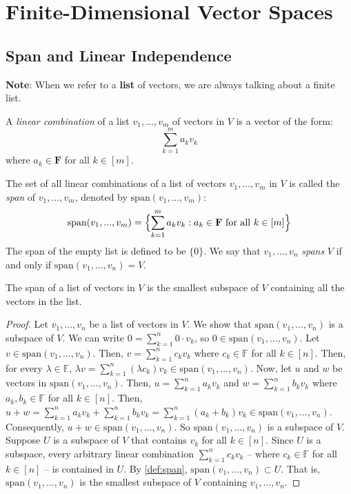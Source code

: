 \documentclass{article}
\begin{document}
\section{Finite-Dimensional Vector Spaces}

\subsection{Span and Linear Independence}

\textbf{Note}: When we refer to a \textbf{list} of vectors, we are
always talking about a finite list.

\begin{definition}
  A \textit{linear combination} of a list $v_1, ..., v_m$ of vectors
  in $V$ is a vector of the form:
  $$\sum_{k=1}^m a_k v_k$$
  where $a_k \in \mathbf{F}$ for all $k \in [m]$.
\end{definition}

\begin{definition}
  \label{def:span}
  The set of all linear combinations of a list of vectors $v_1, ...,
  v_m$ in $V$ is called the \textit{span} of $v_1, ..., v_m$, denoted
  by $\text{span}(v_1, ..., v_m)$:
  $$\text{span}(v_1, ..., v_m) = \Bigl\{\sum_{k=1}^m a_k v_k: a_k \in
  \mathbf{F} \text{ for all } k \in [m]\Bigr\}$$
  The span of the empty list is defined to be $\{0\}$. We say that
  $v_1, ..., v_n$ \textit{spans} $V$ if and only if $\text{span}(v_1,
  ..., v_n) = V$.
\end{definition}

\begin{theorem}
  The span of a list of vectors in $V$ is the smallest subspace of $V$
  containing all the vectors in the list.
\end{theorem}
\begin{proof}
  Let $v_1, ..., v_n$ be a list of vectors in $V$. We show that
  $\text{span}(v_1, ..., v_n)$ is a subspace of $V$. We can write
  $0 = \sum_{k=1}^n 0 \cdot v_k$, so
  $0 \in \text{span}(v_1, ..., v_n)$. Let
  $v \in \text{span}(v_1, ..., v_n)$. Then, $v = \sum_{k=1}^n c_k v_k$
  where $c_k \in \mathbb{F}$ for all $k \in [n]$. Then, for every
  $\lambda \in \mathbb{F}$,
  $\lambda v = \sum_{k=1}^n (\lambda c_k) v_k \in \text{span}(v_1,
  ..., v_n)$. Now, let $u$ and $w$ be vectors in
  $\text{span}(v_1, ..., v_n)$. Then, $u = \sum_{k=1}^n a_k v_k$ and
  $w = \sum_{k=1}^n b_k v_k$ where $a_k, b_k \in \mathbb{F}$ for all
  $k \in [n]$.  Then,
  $u + w = \sum_{k=1}^n a_k v_k + \sum_{k=1}^n b_k v_k = \sum_{k=1}^n
  (a_k + b_k) v_k \in \text{span}(v_1, ..., v_n)$. Consequently,
  $u + w \in \text{span}(v_1, ..., v_n)$. So
  $\text{span}(v_1, ..., v_n)$ is a subspace of $V$. Suppose $U$ is a
  subspace of $V$ that contains $v_k$ for all $k \in [n]$. Since $U$
  is a subspace, every arbitrary linear combination
  $\sum_{k=1}^n c_k v_k$ -- where $c_k \in \mathbb{F}$ for all
  $k \in [n]$ -- is contained in $U$. By \cref{def:span},
  $\text{span}(v_1, ..., v_n) \subset U$. That is,
  $\text{span}(v_1, ..., v_n)$ is the smallest subspace of $V$
  containing $v_1, ..., v_n$.
\end{proof}
\end{document}
